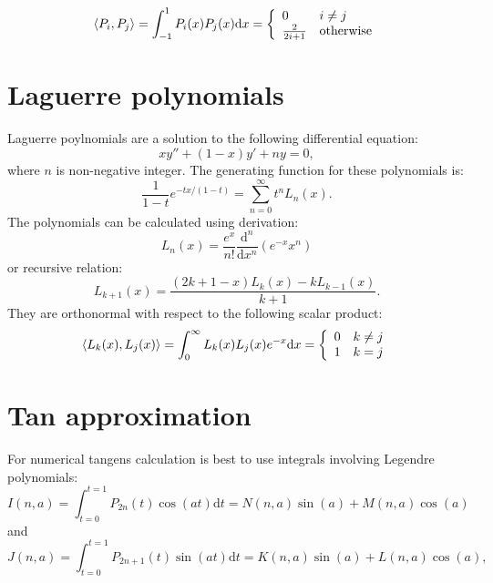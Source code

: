 \documentclass[openany, longbibliography,slovene,a4paper,12pt]{article}
\newcommand{\dif}{\mathrm{d}}
\begin{document}
\[   \braket{P_i, P_j}=\int_{-1}^{1} P_i(x) P_j(x) \dif x=
  \left\{
\begin{array}{ll}
      0 & i\neq j \\
      \frac{2}{2i+1} & \mathrm{otherwise} \\
\end{array} 
\right. \]


\section{Laguerre polynomials}
Laguerre poylnomials are a solution to the following differential equation:
\begin{equation}
  xy'' + (1-x)y'+ny=0,
  \end{equation}
where $n$ is non-negative integer. The generating function for these polynomials
is:
\begin{equation}
  \frac{1}{1-t}e^{-tx/(1-t)}=\sum_{n=0}^\infty t^nL_n(x).
  \end{equation}
  The polynomials can be calculated using derivation:
  \begin{equation}
    L_n(x)=\frac{e^x}{n!}\frac{\dif^n}{\dif x^n}\left(e^{-x}x^n \right)
    \end{equation}
    or recursive relation:
    \begin{equation}
      L_{k+1}(x)=\frac{(2k+1-x)L_k(x)-kL_{k-1}(x)}{k+1}.
    \end{equation}
    They are orthonormal with respect to the following scalar product:
    \[
      \braket{L_k(x), L_j(x)}= \int_0^\infty L_k(x)L_j(x)e^{-x} \dif x =
        \left\{
\begin{array}{ll}
      0 & k\neq j \\
      1 & k=j \\
\end{array} 
\right.
\]


\section{Tan approximation}

For numerical tangens calculation is best to use integrals involving Legendre
polynomials:
\begin{equation}
  I(n,a)=\int_{t=0}^{t=1}P_{2n}(t)\cos(at)\dif t = N(n,a)\sin(a)+M(n,a)\cos(a)
  \end{equation}
and
\begin{equation}
  J(n,a)=\int_{t=0}^{t=1}P_{2n+1}(t)\sin(at)\dif t = K(n,a)\sin(a)+L(n,a)\cos(a),
\end{equation}
\end{document}
